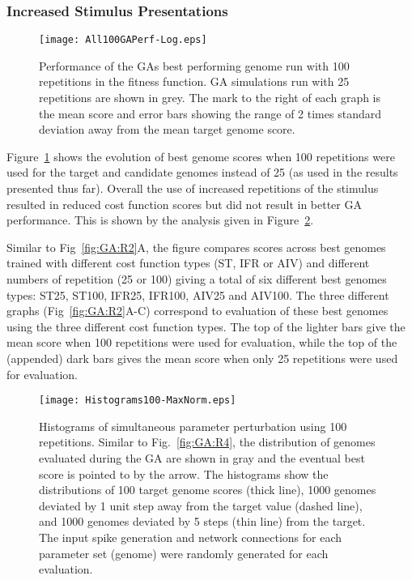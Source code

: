 \subsubsection{Increased Stimulus Presentations}

\begin{figure}[th!]
  \centering
  \texttt{[image: All100GAPerf-Log.eps]}
  \caption{Performance of the GAs best performing genome run with 100
    repetitions in the fitness function. GA simulations run with 25 repetitions are shown in grey. The mark to the right of each graph is the mean
    score and error bars showing the range of 2 times standard
    deviation away from the mean target genome score.}\label{fig:GA:R5}
\end{figure}

Figure~\ref{fig:GA:R5} shows the evolution of best genome scores when 100
repetitions were used for the target and candidate genomes instead of
25 (as used in the results presented thus far). Overall the use of
increased repetitions of the stimulus resulted in reduced cost
function scores but did not result in better GA performance. This is
shown by the analysis given in Figure~\ref{fig:GA:R6}.

\smallskip{}

Similar to Fig~\ref{fig:GA:R2}A, the figure compares scores across best genomes
trained with different cost function types (ST, IFR or AIV) and different
numbers of repetition (25 or 100) giving a total of six different best genomes
types: ST25, ST100, IFR25, IFR100, AIV25 and AIV100. The three different graphs
(Fig~\ref{fig:GA:R2}A-C) correspond to evaluation of these best genomes using the
three different cost function types. The top of the lighter bars give the mean
score when 100 repetitions were used for evaluation, while the top of the
(appended) dark bars gives the mean score when only 25 repetitions were used
for evaluation.

\begin{figure}[th!]
  \centering
  \texttt{[image: Histograms100-MaxNorm.eps]}  
  \caption{Histograms of simultaneous parameter perturbation using 100
    repetitions. Similar to Fig.~\ref{fig:GA:R4}, the distribution of
    genomes evaluated during the GA are shown in gray and the eventual
    best score is pointed to by the arrow. The histograms show the
    distributions of 100 target genome scores (thick line), 1000
    genomes deviated by 1 unit step away from the target value (dashed
    line), and 1000 genomes deviated by 5 steps (thin line) from the
    target. The input spike generation and network connections for
    each parameter set (genome) were randomly generated for each
    evaluation.}
  \label{fig:GA:R6}
\end{figure}

